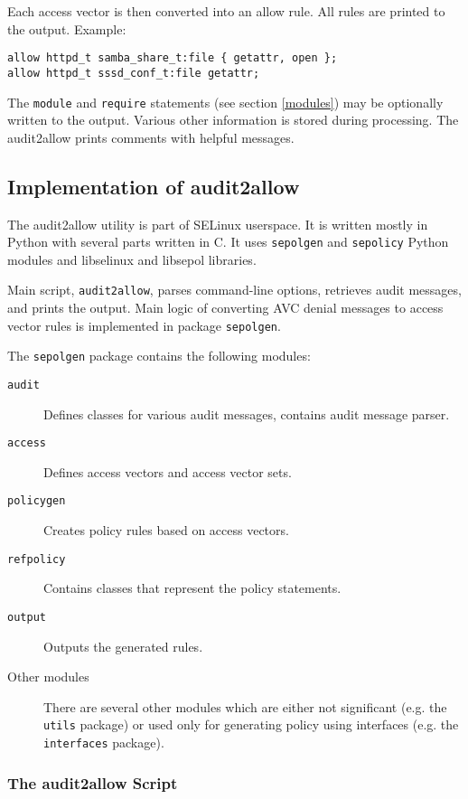 Each access vector is then converted into an allow rule. All rules are printed
to the output. Example:
\begin{lstlisting}
allow httpd_t samba_share_t:file { getattr, open };
allow httpd_t sssd_conf_t:file getattr;
\end{lstlisting}
The \texttt{module} and \texttt{require} statements (see section \ref{modules})
may be optionally written to the output. Various other information is stored
during processing. The audit2allow prints comments with helpful messages.

\subsection{Implementation of audit2allow}
The audit2allow utility is part of SELinux userspace. It is written mostly in
Python with several parts written in C. It uses \texttt{sepolgen} and
\texttt{sepolicy} Python modules and libselinux and libsepol libraries.

Main script, \texttt{audit2allow}, parses command-line options, retrieves audit
messages, and prints the output.  Main logic of converting AVC denial messages
to access vector rules is implemented in package \texttt{sepolgen}.

The \texttt{sepolgen} package contains the following modules:
\begin{description}
    \item [\texttt{audit}] Defines classes for various audit messages, contains
        audit message parser.
    \item [\texttt{access}] Defines access vectors and access vector sets.
    \item [\texttt{policygen}] Creates policy rules based on access vectors.
    \item [\texttt{refpolicy}] Contains classes that represent the policy
        statements.
    \item [\texttt{output}] Outputs the generated rules.
    \item [Other modules] There are several other modules which are either not
        significant (e.g. the \texttt{utils} package) or used only for
        generating policy using interfaces (e.g. the \texttt{interfaces}
        package).
\end{description}

\subsubsection{The audit2allow Script}


